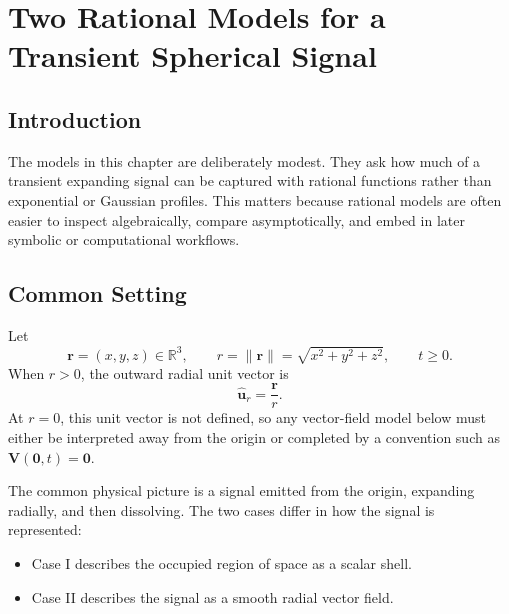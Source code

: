 \chapter{Two Rational Models for a Transient Spherical Signal}

\begingroup

\begin{abstract}
This note merges two closely related descriptions of a transient spherical
signal in three-dimensional space. The first case is a scalar shell model: the
signal occupies a time-dependent spherical layer whose outer radius expands
asymptotically and whose thickness eventually collapses. The second case is a
radial vector field: the signal is represented by a smooth outward field whose
magnitude is concentrated near an expanding radius. Both constructions use
rational algebraic functions rather than exponentials or Gaussian profiles.
\end{abstract}

\section{Introduction}

The models in this chapter are deliberately modest. They ask how much of a
transient expanding signal can be captured with rational functions rather than
exponential or Gaussian profiles. This matters because rational models are
often easier to inspect algebraically, compare asymptotically, and embed in
later symbolic or computational workflows.

\section{Common Setting}

Let
\[
    \bm{r}=(x,y,z)\in\mathbb{R}^3,
    \qquad
    r=\|\bm{r}\|=\sqrt{x^2+y^2+z^2},
    \qquad
    t\ge 0.
\]
When \(r>0\), the outward radial unit vector is
\[
    \hat{\bm{u}}_r=\frac{\bm{r}}{r}.
\]
At \(r=0\), this unit vector is not defined, so any vector-field model below
must either be interpreted away from the origin or completed by a convention
such as \(\bm{V}(\bm{0},t)=\bm{0}\).

The common physical picture is a signal emitted from the origin, expanding
radially, and then dissolving. The two cases differ in how the signal is
represented:
\begin{itemize}
    \item Case I describes the occupied region of space as a scalar shell.
    \item Case II describes the signal as a smooth radial vector field.
\end{itemize}

